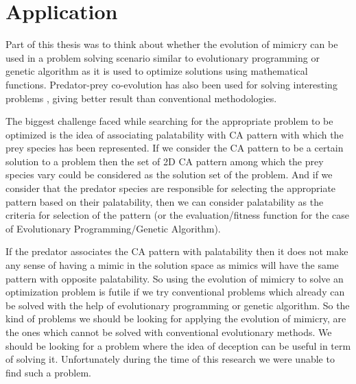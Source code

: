 \chapter{Application}

Part of this thesis was to think about whether the evolution of mimicry can be used in a problem solving scenario similar to evolutionary programming or genetic algorithm as it is used to optimize solutions using mathematical functions. Predator-prey co-evolution has also been used for solving interesting problems \cite{hillis1990}, giving better result than conventional methodologies. 

The biggest challenge faced while searching for the appropriate problem to be optimized is the idea of associating palatability with CA pattern with which the prey species has been represented. If we consider the CA pattern to be a certain solution to a problem then the set of 2D CA pattern among which the prey species vary could be considered as the solution set of the problem. And if we consider that the predator species are responsible for selecting the appropriate pattern based on their palatability, then we can consider palatability as the criteria for selection of the pattern (or the evaluation/fitness function for the case of Evolutionary Programming/Genetic Algorithm). 

If the predator associates the CA pattern with palatability then it does not make any sense of having a mimic in the solution space as mimics will have the same pattern with opposite palatability. So using the evolution of mimicry to solve an optimization problem is futile if we try conventional problems which already can be solved with the help of evolutionary programming or genetic algorithm. 
So the kind of problems we should be looking for applying the evolution of mimicry, are the ones which cannot be solved with conventional evolutionary methods. We should be looking for a problem where the idea of deception can be useful in term of solving it. Unfortunately during the time of this research we were unable to find such a problem. 
